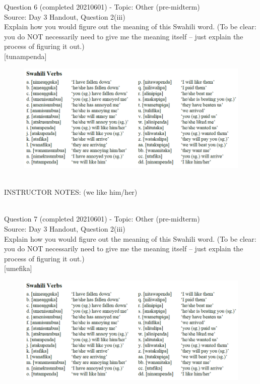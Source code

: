 \documentclass[12pt]{article}
\begin{document}
{\large Question 6} (completed 20210601) - Topic: Other (pre-midterm)\\
Source: Day 3 Handout, Question 2(iii)\\

Explain how you would figure out the meaning of this Swahili word. (To be clear: you do NOT necessarily need to give me the meaning itself -- just explain the process of figuring it out.)\\

{[tunampenda]}

\begin{figure}[H]
\includegraphics{../images/swahiliverbs.png}
\end{figure}

~\\
INSTRUCTOR NOTES: (we like him/her)


~\\

{\large Question 7} (completed 20210601) - Topic: Other (pre-midterm)\\
Source: Day 3 Handout, Question 2(iii)\\

Explain how you would figure out the meaning of this Swahili word. (To be clear: you do NOT necessarily need to give me the meaning itself -- just explain the process of figuring it out.)\\

{[umefika]}

\begin{figure}[H]
\includegraphics{../images/swahiliverbs.png}
\end{figure}
\end{document}
